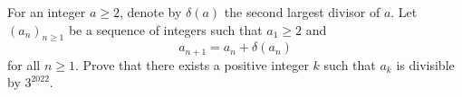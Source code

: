 For an integer $a\geq 2$, denote by $\delta(a)$ the second largest divisor of $a$.
Let $(a_n)_{n\geq 1}$ be a sequence of integers such that $a_1\geq 2$ and 
$$a_{n+1} = a_n + \delta(a_n)$$
for all $n\geq 1$.
Prove that there exists a positive integer $k$ such that $a_k$ is divisible by $3^{2022}$.
